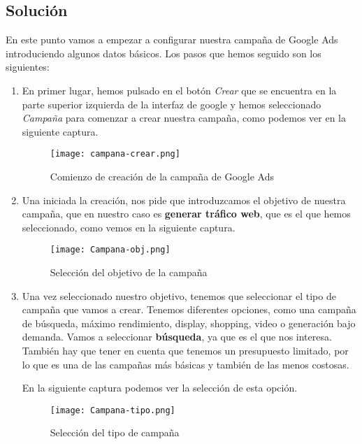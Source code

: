 \subsection{Solución}
En este punto vamos a empezar a configurar nuestra campaña de Google Ads introduciendo algunos datos básicos. Los pasos que hemos seguido son los siguientes:

\begin{enumerate}
    \item En primer lugar, hemos pulsado en el botón \textit{Crear} que se encuentra en la parte superior izquierda de la interfaz de google y hemos seleccionado \textit{Campaña} para comenzar a crear nuestra campaña, como podemos ver en la siguiente captura.

    \begin{figure}[H]
        \centering
        \texttt{[image: campana-crear.png]}
        \caption{Comienzo de creación de la campaña de Google Ads}
    \end{figure}

    \item Una iniciada la creación, nos pide que introduzcamos el objetivo de nuestra campaña, que en nuestro caso es \textbf{generar tráfico web}, que es el que hemos seleccionado, como vemos en la siguiente captura.

    \begin{figure}[H]
        \centering
        \texttt{[image: Campana-obj.png]}
        \caption{Selección del objetivo de la campaña}
    \end{figure}

    \item Una vez seleccionado nuestro objetivo, tenemos que seleccionar el tipo de campaña que vamos a crear. Tenemos diferentes opciones, como una campaña de búsqueda, máximo rendimiento, display, shopping, video o generación bajo demanda. Vamos a seleccionar \textbf{búsqueda}, ya que es el que nos interesa. También hay que tener en cuenta que tenemos un presupuesto limitado, por lo que es una de las campañas más básicas y también de las menos costosas.

    En la siguiente captura podemos ver la selección de esta opción.

    \begin{figure}[H]
        \centering
        \texttt{[image: Campana-tipo.png]}
        \caption{Selección del tipo de campaña}
    \end{figure}


\end{enumerate}
